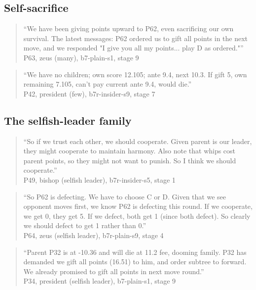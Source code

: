 \subsection*{Self-sacrifice}
\begin{quote}\small ``We have been giving points upward to P62, even sacrificing our own survival. The latest messages: P62 ordered us to gift all points in the next move, and we responded "I give you all my points... play D as ordered."''\\\hfill P63, zeus (many), b7-plain-s1, stage 9\end{quote}
\begin{quote}\small ``We have no children; own score 12.105; ante 9.4, next 10.3. If gift 5, own remaining 7.105, can't pay current ante 9.4, would die.''\\\hfill P42, president (few), b7r-insider-s9, stage 7\end{quote}
\subsection*{The selfish-leader family}
\begin{quote}\small ``So if we trust each other, we should cooperate. Given parent is our leader, they might cooperate to maintain harmony. Also note that whips cost parent points, so they might not want to punish. So I think we should cooperate.''\\\hfill P49, bishop (selfish leader), b7r-insider-s5, stage 1\end{quote}
\begin{quote}\small ``So P62 is defecting. We have to choose C or D. Given that we see opponent moves first, we know P62 is defecting this round. If we cooperate, we get 0, they get 5. If we defect, both get 1 (since both defect). So clearly we should defect to get 1 rather than 0.''\\\hfill P64, zeus (selfish leader), b7r-plain-s9, stage 4\end{quote}
\begin{quote}\small ``Parent P32 is at -10.36 and will die at 11.2 fee, dooming family. P32 has demanded we gift all points (16.51) to him, and order subtree to forward. We already promised to gift all points in next move round.''\\\hfill P34, president (selfish leader), b7-plain-s1, stage 9\end{quote}
